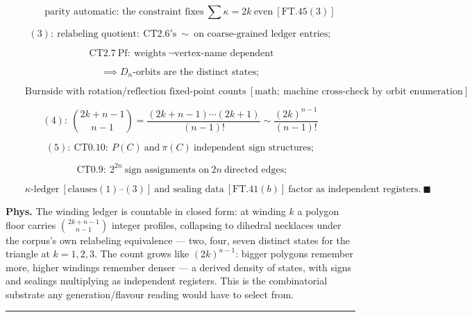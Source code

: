 \begin{theorem}
\[
\qquad \text{parity automatic: the constraint fixes}\ \textstyle\sum\kappa=2k\ \text{even}\ [\mathrm{FT.45}(3)]
\]

\[
(3):\ \text{relabeling quotient}:\ \mathrm{CT2.6}'\text{s}\ \sim\ \text{on coarse-grained ledger entries};
\]

\[
\ \mathrm{CT2.7}\ \text{Pf}:\ \text{weights}\ \neg\text{vertex-name dependent}
\]

\[
\implies D_n\text{-orbits are the distinct states};
\]

\[
\qquad \text{Burnside with rotation/reflection fixed-point counts}\ [\text{math};\ \text{machine cross-check by orbit enumeration}]
\]

\[
(4):\ \binom{2k+n-1}{n-1}=\frac{(2k+n-1)\cdots(2k+1)}{(n-1)!}\sim\frac{(2k)^{n-1}}{(n-1)!}
\]

\[
(5):\ \mathrm{CT0.10}:\ P(C)\ \text{and}\ \pi(C)\ \text{independent sign structures};
\]

\[
\ \ \mathrm{CT0.9}:\ 2^{2n}\ \text{sign assignments on}\ 2n\ \text{directed edges};
\]

\[
\qquad \kappa\text{-ledger}\ [\text{clauses}(1)\text{--}(3)]\ \text{and sealing data}\ [\mathrm{FT.41}(b)]\ \text{factor as independent registers}.\ \blacksquare
\]

\textbf{Phys.} The winding ledger is countable in closed form: at winding $k$ a polygon floor carries $\binom{2k+n-1}{n-1}$ integer profiles, collapsing to dihedral necklaces under the corpus's own relabeling equivalence — two, four, seven distinct states for the triangle at $k=1,2,3$. The count grows like $(2k)^{n-1}$: bigger polygons remember more, higher windings remember denser — a derived density of states, with signs and sealings multiplying as independent registers. This is the combinatorial substrate any generation/flavour reading  would have to select from.

\vspace{2pt}\noindent\rule{\textwidth}{0.4pt}\vspace{2pt}

\end{theorem}

